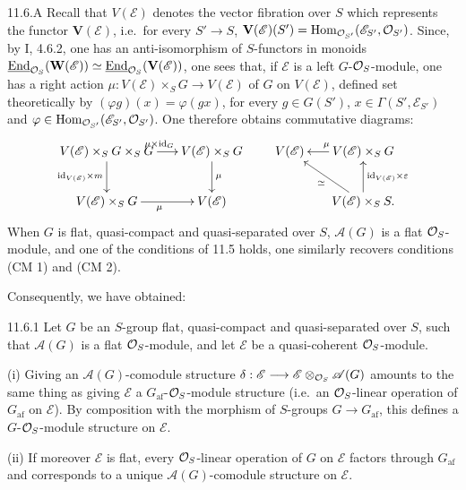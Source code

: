 \begin{remark}{11.6.A}\label{VIB.11.6.A}
Recall that $V(\mathscr E)$ denotes the vector fibration over $S$ which represents the functor $\mathbf V(\mathscr E)$, i.e.\ for every $S'\to S$, $\mathbf V(\mathscr E)(S')=\operatorname{Hom}_{\mathcal{O}_{S'}}(\mathscr E_{S'},\mathcal{O}_{S'})$. Since, by I, 4.6.2, one has an anti-isomorphism of $S$-functors in monoids $\underline{\operatorname{End}}_{\mathcal{O}_S}(\mathbf W(\mathscr E))\simeq\underline{\operatorname{End}}_{\mathcal{O}_S}(\mathbf V(\mathscr E))$, one sees that, if $\mathscr E$ is a left $G$-$\mathcal{O}_S$-module, one has a right action $\mu:V(\mathscr E)\times_S G\to V(\mathscr E)$ of $G$ on $V(\mathscr E)$, defined set theoretically by $(\varphi g)(x)=\varphi(gx)$, for every $g\in G(S')$, $x\in\Gamma(S',\mathscr E_{S'})$ and $\varphi\in\operatorname{Hom}_{\mathcal{O}_{S'}}(\mathscr E_{S'},\mathcal{O}_{S'})$. One therefore obtains commutative diagrams:
\[
\xymatrix@C=16pt{V(\mathscr E)\times_S G\times_S G\ar[r]^{\mu\times\mathrm{id}_G}\ar[d]_{\mathrm{id}_{V(\mathscr E)}\times m}&V(\mathscr E)\times_S G\ar[d]^\mu\\V(\mathscr E)\times_S G\ar[r]_\mu&V(\mathscr E)}
\qquad
\xymatrix@C=16pt{V(\mathscr E)&V(\mathscr E)\times_S G\ar[l]_\mu\\&V(\mathscr E)\times_S S\ar[u]_{\mathrm{id}_{V(\mathscr E)}\times\varepsilon}\ar[ul]^\simeq.}
\]
When $G$ is flat, quasi-compact and quasi-separated over $S$, $\mathscr A(G)$ is a flat $\mathcal{O}_S$-module, and one of the conditions of 11.5 holds, one similarly recovers conditions (CM 1) and (CM 2).
\end{remark}
Consequently, we have obtained:

\begin{proposition}{11.6.1}\label{VIB.11.6.1}
Let $G$ be an $S$-group flat, quasi-compact and quasi-separated over $S$, such that $\mathscr A(G)$ is a flat $\mathcal{O}_S$-module, and let $\mathscr E$ be a quasi-coherent $\mathcal{O}_S$-module.

(i) Giving an $\mathscr A(G)$-comodule structure $\delta:\mathscr E\longrightarrow\mathscr E\otimes_{\mathcal{O}_S}\mathscr A(G)$ amounts to the same thing as giving $\mathscr E$ a $G_{\mathrm{af}}$-$\mathcal{O}_S$-module structure (i.e.\ an $\mathcal{O}_S$-linear operation of $G_{\mathrm{af}}$ on $\mathscr E$). By composition with the morphism of $S$-groups $G\to G_{\mathrm{af}}$, this defines a $G$-$\mathcal{O}_S$-module structure on $\mathscr E$.

(ii) If moreover $\mathscr E$ is flat, every $\mathcal{O}_S$-linear operation of $G$ on $\mathscr E$ factors through $G_{\mathrm{af}}$ and corresponds to a unique $\mathscr A(G)$-comodule structure on $\mathscr E$.
\end{proposition}


